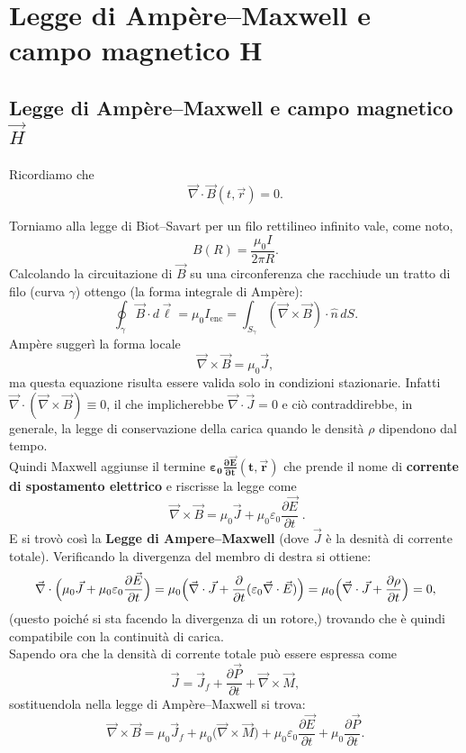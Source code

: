 \documentclass{book}
\begin{document}
\chapter{Legge di Amp\`ere--Maxwell e campo magnetico \texorpdfstring{$\mathbf{H}$}{H}}

\section{Legge di Ampère--Maxwell e campo magnetico \texorpdfstring{$\vec{H}$}{H}}
 Ricordiamo che
\[
\vec{\nabla}\cdot\vec{B}(t,\vec{r}) = 0.
\]


Torniamo alla legge di Biot--Savart per un filo rettilineo infinito vale, come noto,
\[
B(R) = \frac{\mu_0 I}{2\pi R}.
\]
Calcolando la circuitazione di \(\vec{B}\) su una circonferenza che racchiude un tratto di filo (curva $\gamma$) ottengo (la forma integrale di Ampère):
\[
\oint_{\gamma}\vec{B}\cdot d\vec{\ell} = \mu_0 I_{\mathrm{enc}}
= \int_{S_\gamma} (\vec{\nabla}\times\vec{B})\cdot\hat{n}\,dS.
\]
Ampère suggerì la forma locale
\[
\vec{\nabla}\times\vec{B} = \mu_0\vec{J},
\]
ma questa equazione risulta essere valida solo in condizioni stazionarie. Infatti \(\vec{\nabla}\cdot(\vec{\nabla}\times\vec{B})\equiv 0\), il che implicherebbe \(\vec{\nabla}\cdot\vec{J}=0\) e ciò contraddirebbe, in generale, la legge di conservazione della carica quando le densità \(\rho\) dipendono dal tempo.
\\
Quindi Maxwell aggiunse il termine $\bm{\varepsilon_0 \frac{\partial\vec{E}}{\partial t}(t,\vec{r})}$
che prende il nome di \textbf{ corrente di spostamento elettrico}  e riscrisse la legge come
\[
\boxed{\;\vec{\nabla}\times\vec{B} = \mu_0\vec{J} + \mu_0\varepsilon_0\frac{\partial\vec{E}}{\partial t}\; }.
\]
E si trovò così la \textbf{Legge di Ampere--Maxwell}
(dove $\vec{J}$ è la desnità di corrente totale).
Verificando la divergenza del membro di destra si ottiene:
\[
\vec{\nabla}\cdot\Bigl(\mu_0\vec{J} + \mu_0\varepsilon_0\frac{\partial\vec{E}}{\partial t}\Bigr)
= \mu_0\Bigl(\vec{\nabla}\cdot\vec{J} + \frac{\partial}{\partial t}(\varepsilon_0\vec{\nabla}\cdot\vec{E})\Bigr)
= \mu_0\Bigl(\vec{\nabla}\cdot\vec{J} + \frac{\partial\rho}{\partial t}\Bigr)=0,
\]
(questo poiché si sta facendo la divergenza di un rotore,) trovando che è quindi compatibile con la continuità di carica.
\\
Sapendo ora che la densità di corrente totale può essere espressa come
\[
\vec{J} = \vec{J}_{\!f} + \frac{\partial\vec{P}}{\partial t} + \vec{\nabla}\times\vec{M},
\]
sostituendola nella legge di Ampère--Maxwell si trova:
\[
\vec{\nabla}\times\vec{B}
= \mu_0\vec{J}_{\!f} + \mu_0\bigl(\vec{\nabla}\times\vec{M}\bigr)
+ \mu_0\varepsilon_0 \frac{\partial\vec{E}}{\partial t}
+ \mu_0\frac{\partial\vec{P}}{\partial t}.
\]
\end{document}
